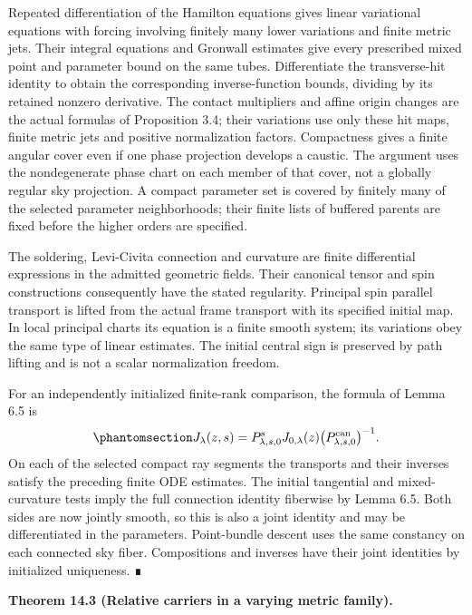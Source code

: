 \documentclass[
  english,
  11pt,
  reqno]{amsart}
\makeatletter
\newcommand{\pandocstatementheading}[1]{%
  \par\addpenalty{\@beginparpenalty}%
  \addvspace{.5\baselineskip plus .2\baselineskip minus .2\baselineskip}%
  {\normalfont\bfseries #1\par}%
  \nobreak\@afterindenttrue\@afterheading
}
\makeatother
\begin{document}
Repeated differentiation of the Hamilton equations gives linear
variational equations with forcing involving finitely many lower
variations and finite metric jets. Their integral equations and Gronwall
estimates give every prescribed mixed point and parameter bound on the
same tubes. Differentiate the transverse-hit identity to obtain the
corresponding inverse-function bounds, dividing by its retained nonzero
derivative. The contact multipliers and affine origin changes are the
actual formulas of Proposition 3.4; their variations use only these hit
maps, finite metric jets and positive normalization factors. Compactness
gives a finite angular cover even if one phase projection develops a
caustic. The argument uses the nondegenerate phase chart on each member
of that cover, not a globally regular sky projection. A compact
parameter set is covered by finitely many of the selected parameter
neighborhoods; their finite lists of buffered parents are fixed before
the higher orders are specified.

The soldering, Levi-Civita connection and curvature are finite
differential expressions in the admitted geometric fields. Their
canonical tensor and spin constructions consequently have the stated
regularity. Principal spin parallel transport is lifted from the actual
frame transport with its specified initial map. In local principal
charts its equation is a finite smooth system; its variations obey the
same type of linear estimates. The initial central sign is preserved by
path lifting and is not a scalar normalization freedom.

For an independently initialized finite-rank comparison, the formula of
Lemma 6.5 is
\begin{equation}\protect\phantomsection\label{eq:family-initialized-finite-rank-comparison}{
J_\lambda(z,s)
=P^{\mathrm s}_{\lambda,s,0}
 J_{0,\lambda}(z)
 \bigl(P^{\mathrm{can}}_{\lambda,s,0}\bigr)^{-1}.
}\end{equation} On each of the selected compact ray segments the
transports and their inverses satisfy the preceding finite ODE
estimates. The initial tangential and mixed-curvature tests imply the
full connection identity fiberwise by Lemma 6.5. Both sides are now
jointly smooth, so this is also a joint identity and may be
differentiated in the parameters. Point-bundle descent uses the same
constancy on each connected sky fiber. Compositions and inverses have
their joint identities by initialized uniqueness. ∎

\pandocstatementheading{\protect{}\label{thm:family-relative-carrier-comparison}Theorem 14.3 (Relative carriers in a varying metric family).}
\end{document}

